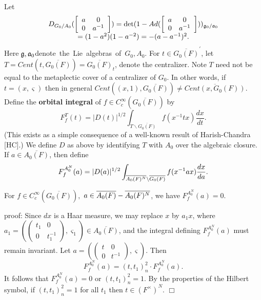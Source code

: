 Let 
\[
\begin{array}{c}
D_{G_0/A_0}(\left[ 
\begin{array}{cc}
a & 0 \\ 
0 & a^{-1}
\end{array}
\right] )=\det (1-Ad(\left[ 
\begin{array}{cc}
a & 0 \\ 
0 & a^{-1}
\end{array}
\right] ))_{{\frak g}_0/{\frak a}_0} \\ 
=(1-a^2)(1-a^{-2})=-(a-a^{-1})^2.
\end{array}
\]
Here$\;{\frak g},{\frak a}_0$denote\ the\ Lie\ algebras\ of\ $G_0,A_0$. For $%
t\in \overline{G_0(F)}^{\prime }$, let $T=Cent(t,\overline{G_0(F)})=%
\overline{G_0(F)}_t$, denote the centralizer. Note $T$ need not be equal to
the metaplectic cover of a centralizer of $G_0$. In other words, if $%
t=(x,\varsigma )$ then in general $Cent((x,1),\overline{G_0(F)})\neq 
\overline{Cent(x,G_0(F))}$. Define the {\bf orbital integral} of $f\in
C_c^\infty (\overline{G_0(F)})$ by 
\begin{equation}
F_f^T(t)=|D(t)|^{1/2}\int_{T\backslash \overline{G_0(F)}}f(x^{-1}tx)\frac{dx%
}{dt}.
\end{equation}
(This exists as a simple consequence of a well-known result of
Harish-Chandra [HC].) We define $D$ as above by identifying $T$ with $A_0$
over the algebraic closure. If $a\in \overline{A_0(F)}$, then define 
\begin{equation}
F_f^{A_0^N}(a)=|D(a)|^{1/2}\int_{\overline{A_0(F)^N}\backslash \overline{%
G_0(F)}}f(x^{-1}ax)\frac{dx}{da}.
\end{equation}

\begin{lemma}
For $f\in C_c^\infty (\overline{G_0(F)}),$ $a\in \overline{A_0(F)}-\overline{%
A_0(F)^N}$, we have $F_f^{A_0^N}(a)=0$.
\end{lemma}

proof: Since $dx$ is a Haar measure, we may replace $x$ by $a_1x$, where $%
a_1=(\left( 
\begin{array}{cc}
t_1 & 0 \\ 
0 & t_1^{-1}
\end{array}
\right) ,\varsigma _1)\in \overline{A_0(F)}$, and the integral defining $%
F_f^{A_0^N}(a)$ must remain invariant. Let $a=(\left( 
\begin{array}{cc}
t & 0 \\ 
0 & t^{-1}
\end{array}
\right) ,\varsigma )$. Then 
\[
F_f^{A_0^N}(a)=(t,t_1)_n^2\cdot F_f^{A_0^N}(a). 
\]
It follows that $F_f^{A_0^N}(a)=0$ or $(t,t_1)_n^2=1$. By the properties of
the Hilbert symbol, if $(t,t_1)_n^2=1$ for all $t_1$ then $t\in (F^{\times
})^N$. $\Box $

